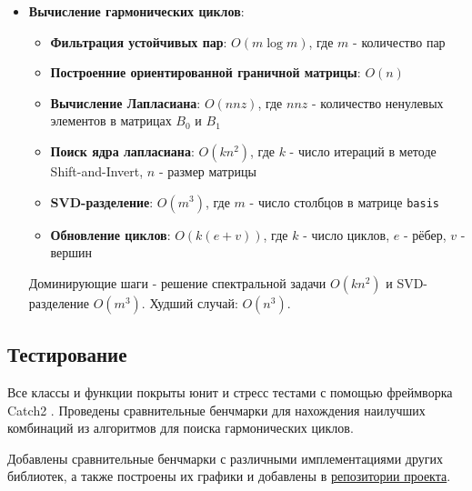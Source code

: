 \documentclass{article}
\begin{document}
\begin{itemize}
\item \textbf{Вычисление гармонических циклов}:
\begin{itemize}
  \item \textbf{Фильтрация устойчивых пар}: $O(m\log m)$, где $m$ - количество пар
  \item \textbf{Построенние ориентированной граничной матрицы}: $O(n)$
  \item \textbf{Вычисление Лапласиана}: $O(nnz)$, где $nnz$ - количество ненулевых элементов в матрицах $B_0$ и $B_1$
  \item \textbf{Поиск ядра лапласиана}: $O(kn^2)$, где $k$ - число итераций в методе Shift-and-Invert, $n$ - размер матрицы
  \item \textbf{SVD-разделение}: $O(m^3)$, где $m$ - число столбцов в матрице \texttt{basis}
  \item \textbf{Обновление циклов}: $O(k(e + v))$, где $k$ - число циклов, $e$ - рёбер, $v$ - вершин
\end{itemize}
Доминирующие шаги - решение спектральной задачи $O(kn^2)$ и SVD-разделение $O(m^3)$. Худший случай: $O(n^3)$.
\end{itemize}
\subsection{Тестирование}
Все классы и функции покрыты юнит и стресс тестами с помощью фреймворка Catch2 \autocite{catch2}. Проведены сравнительные бенчмарки для нахождения наилучших комбинаций из алгоритмов для поиска гармонических циклов.

Добавлены сравнительные бенчмарки с различными имплементациями других библиотек, а также построены их графики и добавлены в \href{https://github.com/Hackerman-ru/Topological-Analysis}{репозитории проекта}.
\newpage
\appendix
\end{document}
